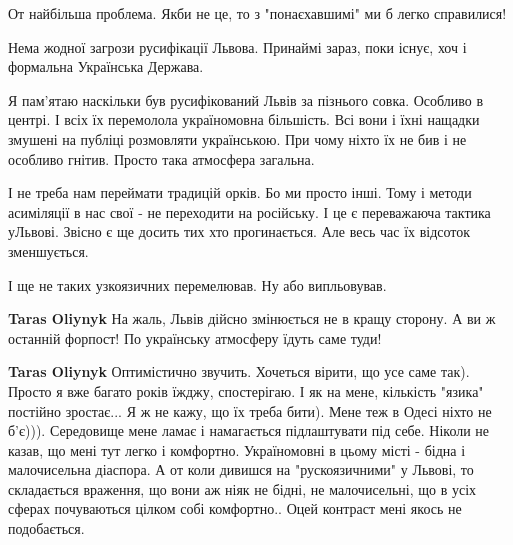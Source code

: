 \begin{itemize}
\begin{itemize}
 
От найбільша проблема. Якби не це, то з "понаєхавшимі" ми б легко справилися!
\end{itemize}

 

Нема жодної загрози русифікації Львова. Принаймі зараз, поки існує, хоч і
формальна Українська Держава.

Я пам'ятаю наскільки був русифікований Львів за пізнього совка. Особливо в
центрі. І всіх їх перемолола україномовна більшість. Всі вони і їхні нащадки
змушені на публіці розмовляти українською. При чому ніхто їх не бив і не
особливо гнітив. Просто така атмосфера загальна.

І не треба нам переймати традицій орків. Бо ми просто інші. Тому і методи
асиміляції в нас свої - не переходити на російську. І це є переважаюча тактика
уЛьвові. Звісно є ще досить тих хто прогинається. Але весь час їх відсоток
зменшується.

І ще не таких узкоязичних перемелював. Ну або випльовував.

\begin{itemize}
 
\textbf{Taras Oliynyk} На жаль, Львів дійсно змінюється не в кращу сторону. А ви ж останній форпост! По українську атмосферу їдуть саме туди!

 
\textbf{Taras Oliynyk} Оптимістично звучить. Хочеться вірити, що усе саме так).
Просто я вже багато років їжджу, спостерігаю. І як на мене, кількість "язика"
постійно зростає... Я ж не кажу, що їх треба бити). Мене теж в Одесі ніхто не
б'є))). Середовище мене ламає і намагається підлаштувати під себе. Ніколи не
казав, що мені тут легко і комфортно. Україномовні в цьому місті - бідна і
малочисельна діаспора. А от коли дивишся на "рускоязичними" у Львові, то
складається враження, що вони аж ніяк не бідні, не малочисельні, що в усіх
сферах почуваються цілком собі комфортно.. Оцей контраст мені якось не
подобається.


\end{itemize}
\end{itemize}
